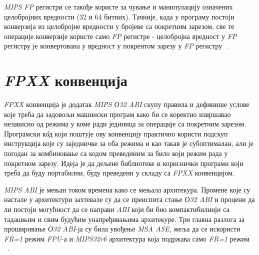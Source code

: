 \documentclass[12pt,oneside]{memoir}
\begin{document}
\indent \textit{MIPS FP} регистри се такође користе за чување и манипулацију означених целобројних вредности (32 и 64 битних). Тачније, када у програму постоји конверзија из целобројне вредности у бројеве са покретним зарезом, све те операције конверзије користе само \textit{FP} регистре - целобројна вредност у  \textit{FP} регистру је конвертована у вредност у покрентом зарезу у  \textit{FP} регистру ~\cite{SeeMIPSRun}.

\section{\textit{FPXX} конвенција}
\label{sec_fpxx}

\indent \textit{FPXX} конвенција је додатак \textit{MIPS О32 ABI} скупу правила и дефинише услове које треба да задовољи машински програм како би се коректно извршавао независно од режима у коме ради јединица за операције са покретним зарезом. Програмски к\^{о}д који поштује ову конвенцију практично користи подскуп инструкција које су заједничке за оба режима и као такав је субоптималан, али је погодан за комбиновање са кодом превединим за било који режим рада у покретном зарезу. Идеја је да дељене библиотеке и кориснички програми који треба да буду портабилни, буду преведени у складу са \textit{FPXX} конвенцијом.


\indent \textit{MIPS ABI} је мењан током времена како се мењала архитекура. Промене које су настале у архитектури захтевале су да се преиспита стање \textit{О32 ABI} и процени да ли постоји могућност да се направи \textit{ABI} који би био компактибилнији са тадашњим и свим будућим унапређивањима архитекуре. Три главна разлога за проширивање \textit{О32 ABI}-ја су била увођење \textit{MSA ASE}, жеља да се искористи \textit{FR=1} режим \textit{FPU}-а и \textit{MIPS32r6} архитектура која подржава само \textit{FR=1} режим ~\cite{fpxxRef}.
\end{document}
